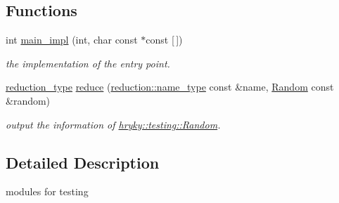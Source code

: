 \subsection*{Functions}
\begin{DoxyCompactItemize}
\item 
\hypertarget{namespacehryky_1_1testing_a3f6a3cf63bf23525fe1e462fd3b83474}{int \hyperlink{namespacehryky_1_1testing_a3f6a3cf63bf23525fe1e462fd3b83474}{main\-\_\-impl} (int, char const $\ast$const \mbox{[}$\,$\mbox{]})}\label{namespacehryky_1_1testing_a3f6a3cf63bf23525fe1e462fd3b83474}

\begin{DoxyCompactList}\small\item\em the implementation of the entry point. \end{DoxyCompactList}\item 
\hypertarget{namespacehryky_1_1testing_ac0d0832965a175843f534a3833e525e9}{\hyperlink{namespacehryky_a343a9a4c36a586be5c2693156200eadc}{reduction\-\_\-type} \hyperlink{namespacehryky_1_1testing_ac0d0832965a175843f534a3833e525e9}{reduce} (\hyperlink{namespacehryky_1_1reduction_ac686c30a4c8d196bbd0f05629a6b921f}{reduction\-::name\-\_\-type} const \&name, \hyperlink{classhryky_1_1testing_1_1_random}{Random} const \&random)}\label{namespacehryky_1_1testing_ac0d0832965a175843f534a3833e525e9}

\begin{DoxyCompactList}\small\item\em output the information of \hyperlink{classhryky_1_1testing_1_1_random}{hryky\-::testing\-::\-Random}. \end{DoxyCompactList}\end{DoxyCompactItemize}


\subsection{Detailed Description}
modules for testing 